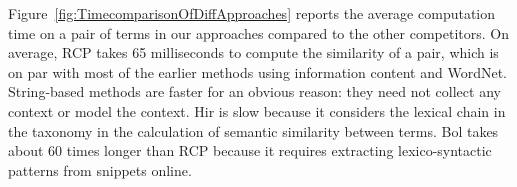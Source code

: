 Figure~\ref{fig:TimecomparisonOfDiffApproaches} reports the average computation time on a pair of terms in our approaches compared to the other
competitors. On average, RCP takes 65 milliseconds to compute the similarity of a pair, which is on par with most of the earlier methods using
information content and WordNet. String-based methods are faster for an obvious reason: they need not collect any context or model the context.
Hir is slow because it considers the lexical chain in the taxonomy in the
calculation of semantic similarity between terms.
Bol takes about 60 times longer than RCP because
it requires extracting lexico-syntactic patterns from snippets online.


